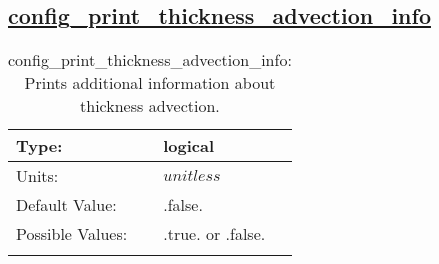 \subsection[config\_print\_thickness\_advection\_info]{\hyperref[sec:nm_tab_debug]{config\_print\_thickness\_advection\_info}}
\label{subsec:nm_sec_config_print_thickness_advection_info}
\begin{center}
\begin{longtable}{| p{2.0in} | p{4.0in} |}
    \hline
    Type: & logical \\
    \hline
    Units: & $unitless$ \\
    \hline
    Default Value: & .false. \\
    \hline
    Possible Values: & .true. or .false. \\
    \hline
    \caption{config\_print\_thickness\_advection\_info: Prints additional information about thickness advection.}
\end{longtable}
\end{center}
